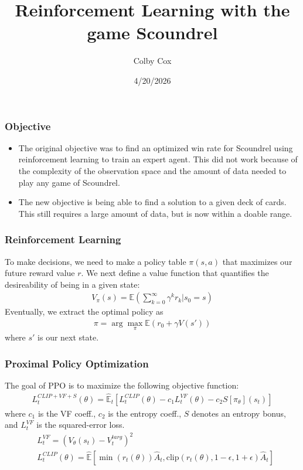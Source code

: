 \documentclass[
	11pt,
]{beamer}
\title[Mathematical Modeling]{Reinforcement Learning with the game Scoundrel}
\author[Colby Cox]{Colby Cox}
\institute[]{University of Central Arkansas}
\date[4/20/2026]{4/20/2026}
\begin{document}
\begin{frame}
	\titlepage
\end{frame}

\begin{frame}
  \frametitle{Objective}
  \begin{itemize}
    \item The original objective was to find an optimized win rate for Scoundrel using reinforcement learning to train an expert agent. This did not work because of the complexity of the observation space and the amount of data needed to play any game of Scoundrel.
    \item The new objective is being able to find a solution to a given deck of cards. This still requires a large amount of data, but is now within a doable range.
  \end{itemize}
\end{frame}

\begin{frame}
  \frametitle{Reinforcement Learning}
  To make decisions, we need to make a policy table $\pi(s, a)$ that maximizes our future reward value $r$. We next define a value function that quantifies the desireability of being in a given state:
  \begin{align*}
    V_\pi(s) = \mathbb{E}\left( \sum_{k=0}^{\infty}\gamma^k r_k | s_0 = s \right)
  \end{align*}
  Eventually, we extract the optimal policy as
  \begin{align*}
    \pi = \arg \max_\pi \mathbb{E} (r_0 + \gamma V(s'))
  \end{align*}
  where $s'$ is our next state.
\end{frame}

\begin{frame}
  \frametitle{Proximal Policy Optimization}
  The goal of PPO is to maximize the following objective function:
  \begin{align*}
    L_t^{CLIP+VF+S}(\theta) = \hat{\mathbb{E}}_t[L_t^{CLIP}(\theta)-c_1L_t^{VF}(\theta)-c_2S[\pi_\theta](s_t)]
  \end{align*}
  where $c_1$ is the VF coeff., $c_2$ is the entropy coeff., $S$ denotes an entropy bonus, and $L_t^{VF}$ is the squared-error loss.
  \begin{align*}
    &L_t^{VF} = (V_\theta(s_t) - V_t^{targ})^2 \\
    &L_t^{CLIP}(\theta) = \hat{\mathbb{E}} \left[ \min(r_t(\theta))\hat{A}_t, \text{clip}(r_t(\theta), 1 - \epsilon, 1 + \epsilon)\hat{A}_t \right]
  \end{align*}
\end{frame}
\end{document}
